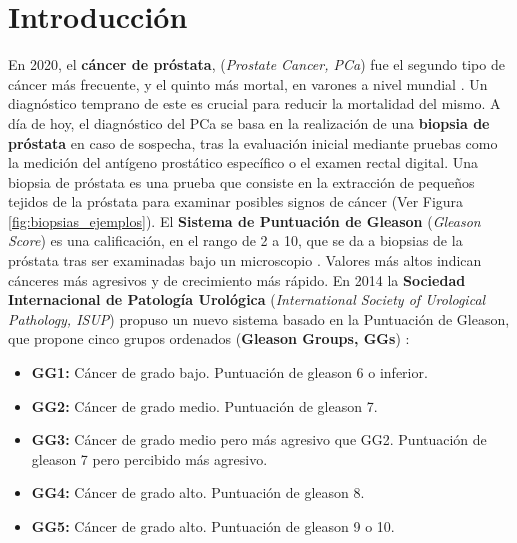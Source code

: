 \newpage
\chapter{Introducción}

En 2020, el \textbf{cáncer de próstata}, (\textit{Prostate Cancer, PCa}) fue el segundo tipo de cáncer más frecuente, y el quinto más mortal, en varones a nivel mundial \cite{GlobalCancer}. Un diagnóstico temprano de este es crucial para reducir la mortalidad del mismo. A día de hoy, el diagnóstico del PCa se basa en la realización de una \textbf{biopsia de próstata} en caso de sospecha, tras la evaluación inicial mediante pruebas como la medición del antígeno prostático específico o el examen rectal digital. Una biopsia de próstata es una prueba que consiste en la extracción de pequeños tejidos de la próstata para examinar posibles signos de cáncer (Ver Figura \ref{fig:biopsias_ejemplos}). El \textbf{Sistema de Puntuación de Gleason} (\textit{Gleason Score}) es una calificación, en el rango de 2 a 10, que se da a biopsias de la próstata tras ser examinadas bajo un microscopio \cite{GleasonGov}. Valores más altos indican cánceres más agresivos y de crecimiento más rápido. En 2014 la \textbf{Sociedad Internacional de Patología Urológica} (\textit{International Society of Urological Pathology, ISUP}) propuso un nuevo sistema basado en la Puntuación de Gleason, que propone cinco grupos ordenados (\textbf{Gleason Groups, GGs}) \cite{ISUP2014Disc}:
\begin{itemize}
\item \textbf{GG1: } Cáncer de grado bajo. Puntuación de gleason 6 o inferior.
\item \textbf{GG2: } Cáncer de grado medio. Puntuación de gleason 7.
\item \textbf{GG3: } Cáncer de grado medio pero más agresivo que GG2. Puntuación de gleason 7 pero percibido más agresivo.
\item \textbf{GG4: } Cáncer de grado alto. Puntuación de gleason 8.
\item \textbf{GG5: } Cáncer de grado alto. Puntuación de gleason 9 o 10.
\end{itemize}

